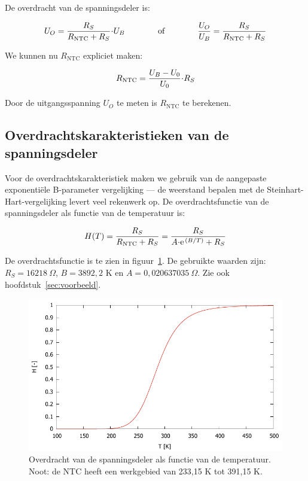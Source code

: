 \documentclass[12pt,a4paper,final,twoside,fleqn]{article}
\newcommand{\rntc}{R_\text{NTC}}
\let\oldcdot\cdot
\renewcommand{\cdot}{\kern-.10em\oldcdot\kern-.10em}
\begin{document}
De overdracht van de spanningsdeler is:

\begin{equation}
U_O = \dfrac{R_S}{\rntc + R_S}\cdot U_B \qquad\qquad\text{of}\qquad\qquad \dfrac{U_O}{U_B}=\dfrac{R_S}{\rntc + R_S}
\end{equation}

We kunnen nu $\rntc$ expliciet maken:

\begin{equation}
\rntc = \dfrac{U_B-U_0}{U_0}\cdot R_S
\end{equation}

Door de uitgangsspanning $U_O$ te meten is $\rntc$ te berekenen.

\subsection{Overdrachtskarakteristieken van de spanningsdeler}
Voor de overdrachtskarakteristiek maken we gebruik van de aangepaste exponenti\"ele
B-parameter vergelijking --- de weerstand bepalen met de Steinhart-Hart-vergelijking
levert veel rekenwerk op.
De overdrachtsfunctie van de spanningsdeler als functie van de temperatuur is:

\begin{equation}
\label{equ:transferh}
H(T) = \dfrac{R_S}{\rntc + R_S}=\dfrac{R_S}{A\cdot\text{e}^{\,(B/T)}+R_S}
\end{equation}

De overdrachtsfunctie is te zien in figuur~\ref{fig:transferfunctionz}. De
gebruikte waarden zijn: $R_S = 16218\ \Omega$, $B = 3892,2$ K en
$A = 0,020637035\ \Omega$. Zie  ook hoofdstuk~\ref{sec:voorbeeld}.

\begin{figure}[ht!]
\centering
\includegraphics[scale=1]{gnuplot/transferfunctionz}
\caption[Overdracht van de spanningsdeler als functie van de temperatuur]{Overdracht van de spanningsdeler als functie van de temperatuur. Noot:
de NTC heeft een werkgebied van 233,15 K tot 391,15 K.}
\label{fig:transferfunctionz}
\end{figure}
\end{document}
